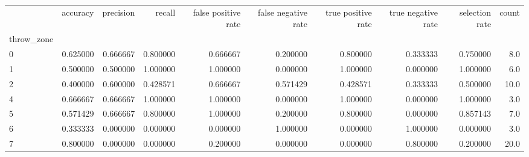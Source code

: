 \begin{tabular}{lrrrrrrrrr}
\toprule
{} &  accuracy &  precision &    recall &  false positive rate &  false negative rate &  true positive rate &  true negative rate &  selection rate &  count \\
throw\_zone &           &            &           &                      &                      &                     &                     &                 &        \\
\midrule
0          &  0.625000 &   0.666667 &  0.800000 &             0.666667 &             0.200000 &            0.800000 &            0.333333 &        0.750000 &    8.0 \\
1          &  0.500000 &   0.500000 &  1.000000 &             1.000000 &             0.000000 &            1.000000 &            0.000000 &        1.000000 &    6.0 \\
2          &  0.400000 &   0.600000 &  0.428571 &             0.666667 &             0.571429 &            0.428571 &            0.333333 &        0.500000 &   10.0 \\
4          &  0.666667 &   0.666667 &  1.000000 &             1.000000 &             0.000000 &            1.000000 &            0.000000 &        1.000000 &    3.0 \\
5          &  0.571429 &   0.666667 &  0.800000 &             1.000000 &             0.200000 &            0.800000 &            0.000000 &        0.857143 &    7.0 \\
6          &  0.333333 &   0.000000 &  0.000000 &             0.000000 &             1.000000 &            0.000000 &            1.000000 &        0.000000 &    3.0 \\
7          &  0.800000 &   0.000000 &  0.000000 &             0.200000 &             0.000000 &            0.000000 &            0.800000 &        0.200000 &   20.0 \\
\bottomrule
\end{tabular}
